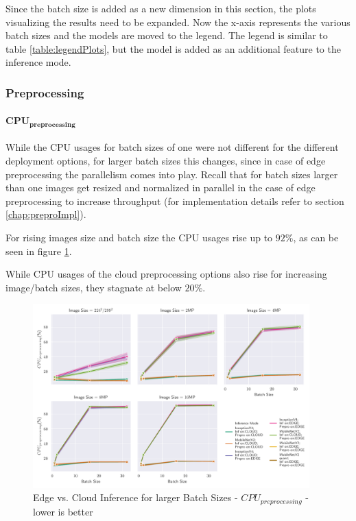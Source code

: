 Since the batch size is added as a new dimension in this section, the plots visualizing the results need to be expanded.
Now the x-axis represents the various batch sizes and the models are moved to the legend. 
The legend is similar to table \ref{table:legendPlots}, but the model is added as an additional feature to the inference mode.
\subsubsection{Preprocessing}

\paragraph{$\mathbf{CPU_{preprocessing}}$}
While the CPU usages for batch sizes of one were not different for the different deployment options, for larger batch sizes this changes, since in case of edge preprocessing the parallelism comes into play.
Recall that for batch sizes larger than one images get resized and normalized in parallel in the case of edge preprocessing to increase throughput (for implementation details refer to section \ref{chap:preproImpl}).

For rising images size and batch size the CPU usages rise up to $92\%$, as can be seen in figure \ref{fig:BatchSizePreproCPU}.

While CPU usages of the cloud preprocessing options also rise for increasing image/batch sizes, they stagnate at below $20\%$.
\begin{figure}[!htb]
\centering
\includegraphics[width=0.95\textwidth]{./Bilder/single_plots/batch_size_plots/Effects_of_Batch_size_Preprocessing_CPU_Usage.pdf}
\caption{Edge vs. Cloud Inference for larger Batch Sizes -  $CPU_{preprocessing}$ - lower is better}
\label{fig:BatchSizePreproCPU}
\end{figure}

